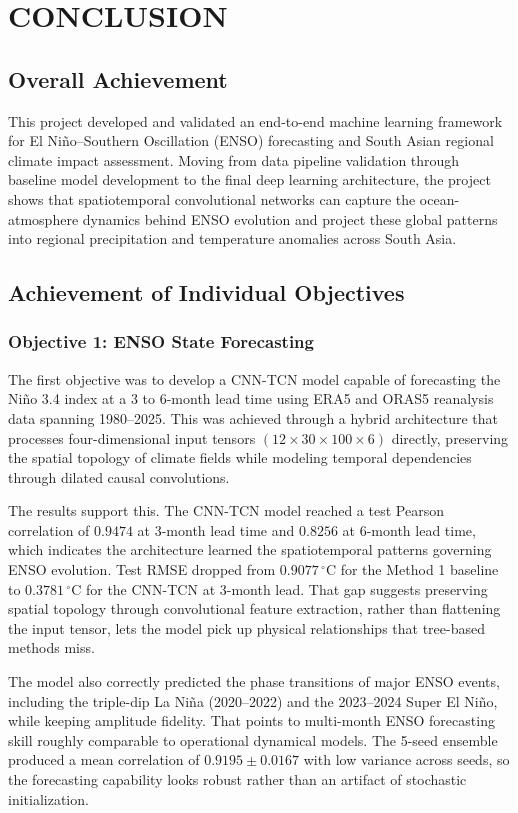 \chapter{CONCLUSION}
\label{chap:conclusion}

\section{Overall Achievement}
This project developed and validated an end-to-end machine learning framework for El Ni\~{n}o--Southern Oscillation (ENSO) forecasting and South Asian regional climate impact assessment. Moving from data pipeline validation through baseline model development to the final deep learning architecture, the project shows that spatiotemporal convolutional networks can capture the ocean-atmosphere dynamics behind ENSO evolution and project these global patterns into regional precipitation and temperature anomalies across South Asia.

\section{Achievement of Individual Objectives}

\subsection{Objective 1: ENSO State Forecasting}
The first objective was to develop a CNN-TCN model capable of forecasting the Ni\~{n}o 3.4 index at a 3 to 6-month lead time using ERA5 and ORAS5 reanalysis data spanning 1980--2025. This was achieved through a hybrid architecture that processes four-dimensional input tensors $(12 \times 30 \times 100 \times 6)$ directly, preserving the spatial topology of climate fields while modeling temporal dependencies through dilated causal convolutions.

The results support this. The CNN-TCN model reached a test Pearson correlation of $0.9474$ at 3-month lead time and $0.8256$ at 6-month lead time, which indicates the architecture learned the spatiotemporal patterns governing ENSO evolution. Test RMSE dropped from $0.9077\,^{\circ}\mathrm{C}$ for the Method 1 baseline to $0.3781\,^{\circ}\mathrm{C}$ for the CNN-TCN at 3-month lead. That gap suggests preserving spatial topology through convolutional feature extraction, rather than flattening the input tensor, lets the model pick up physical relationships that tree-based methods miss.

The model also correctly predicted the phase transitions of major ENSO events, including the triple-dip La Ni\~{n}a (2020--2022) and the 2023--2024 Super El Ni\~{n}o, while keeping amplitude fidelity. That points to multi-month ENSO forecasting skill roughly comparable to operational dynamical models. The 5-seed ensemble produced a mean correlation of $0.9195 \pm 0.0167$ with low variance across seeds, so the forecasting capability looks robust rather than an artifact of stochastic initialization.

